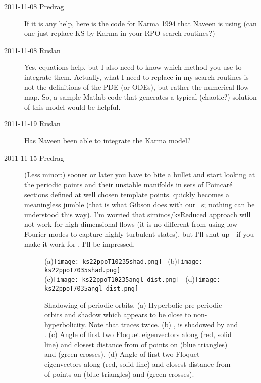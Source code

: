 \begin{description}
\item[2011-11-08 Predrag] If it is any help, here is the code for Karma 1994 that Naveen is using
(can one just replace KS by Karma in your RPO search routines?)

\item[2011-11-08 Ruslan] Yes, equations help, but I also need to know which method you use to integrate them.
Actually, what I need to replace in my search routines is not the definitions of the PDE (or ODEs), but rather the numerical flow map.
So, a sample Matlab code that generates a typical (chaotic?) solution of this model would be helpful.

\item[2011-11-19 Ruslan] Has Naveen been able to integrate the Karma model?

\item[2011-11-15 Predrag] (Less minor:) sooner or later you have to bite
a bullet and start looking at the periodic points and their unstable
manifolds in sets of Poincar\'e sections defined at well chosen template
points.  quickly becomes a meaningless jumble (that
is what Gibson does with our \pCf\ \po s; nothing can be
understood this way). I'm worried that siminos/ksReduced
approach will not work for high-dimensional flows (it is no different
from using low Fourier modes to capture highly turbulent states), but
I'll shut up - if you make it work for \KS, I'll be impressed.

\begin{figure}[ht]
  \begin{center}
    (a)\texttt{[image: ks22ppoT10235shad.png]}~
    (b)\texttt{[image: ks22ppoT7035shad.png]}\\
    (c)\texttt{[image: ks22ppoT10235angl\_dist.png]}~
    (d)\texttt{[image: ks22ppoT7035angl\_dist.png]}
  \end{center}
  \caption{Shadowing of periodic orbits. (a) Hyperbolic pre-periodic orbits
     and  shadow  which appears to be close
    to non-hyperbolicity. Note that  traces  twice.
    (b) , is shadowed by  and .
    (c) Angle of first two Floquet eigenvectors along  (red, solid line) and
    closest distance from  of points on  (blue triangles) and 
    (green crosses). (d) Angle of first two Floquet eigenvectors along  (red, solid line) and
    closest distance from  of points on  (blue triangles) and 
    (green crosses).
    }
  \label{fig:ks22shad}
\end{figure}



\end{description}
